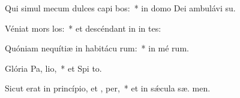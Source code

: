 \item Qui simul mecum dulces capi bos:~* in domo Dei ambulávi  su.
\item Véniat mors  los:~* et descéndant in in tes:
\item Quóniam nequítiæ in habitácu rum:~* in mé rum.
\item Glória Pa,  lio,~* et Spi to.
\item Sicut erat in princípio, et ,  per,~* et in sǽcula sæ. men.
